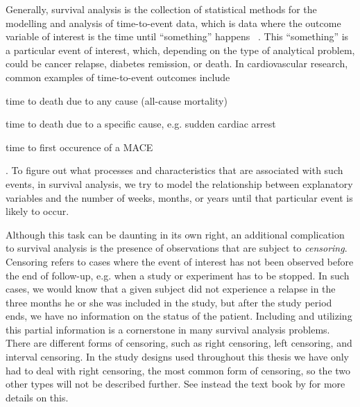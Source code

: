 Generally, 
survival analysis is the collection of statistical methods
for the modelling and analysis of time-to-event data,
which is data where the outcome variable of interest 
is the time until \enquote{something} happens~%
\autocite{kleinbaumSurvival2011}.
This \enquote{something} is a particular event of interest,
which, depending on the type of analytical problem, 
could be cancer relapse, 
diabetes remission,
or death.
In cardiovascular research, 
common examples of time-to-event outcomes include
\begin{enumerate*}
    \item time to death due to any cause (all-cause mortality)
    \item time to death due to a specific cause,
        e.g. sudden cardiac arrest
    \item time to first occurence of a \ac{MACE}
\end{enumerate*}.
To figure out what processes and characteristics 
that are associated with such events, 
in survival analysis, we try to model the relationship between
explanatory variables and the number of weeks, months, or years 
until that particular event is likely to occur. 


Although this task can be daunting in its own right, 
an additional complication to survival analysis 
is the presence of observations that are subject to 
\textit{censoring}.
Censoring refers to cases 
where the event of interest has not been observed 
before the end of follow-up, 
e.g. when a study or experiment has to be stopped.
In such cases, 
we would know that a given subject did not experience a relapse 
in the three months he or she was included in the study, 
but after the study period ends, 
we have no information on the status of the patient. 
Including and utilizing this partial information
is a cornerstone in many survival analysis problems.
There are different forms of censoring,
such as right censoring, left censoring, and interval censoring.
In the study designs used throughout this thesis 
we have only had to deal with right censoring,
the most common form of censoring,
so the two other types  will not be described further.
See instead the text book by \citeauthor{kleinSurvival2003} 
for more details on this.

